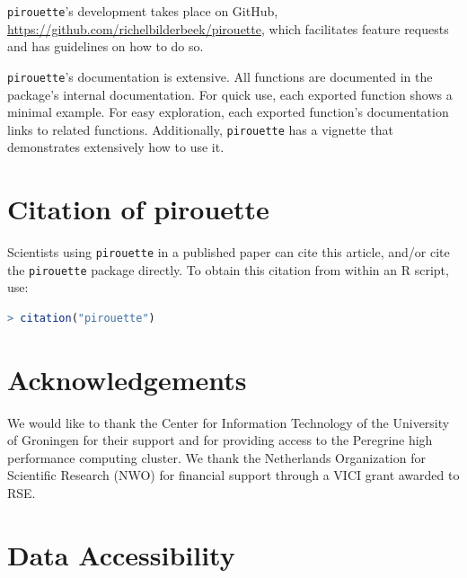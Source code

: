 \documentclass{article}
\begin{document}
\verb;pirouette;'s development takes place on GitHub,
\url{https://github.com/richelbilderbeek/pirouette}, 
which facilitates feature requests and 
has guidelines on how to do so.

\verb;pirouette;'s documentation is extensive. 
All functions are documented in the package's internal documentation. 
For quick use, 
each exported function shows a minimal example. 
For easy exploration, each exported function's documentation links to related functions.
Additionally, \verb;pirouette; has a vignette that demonstrates extensively how to use it. 

\section{Citation of pirouette}

Scientists using \verb;pirouette; in a published paper can cite this
article, and/or cite the \verb;pirouette; package 
directly. To obtain this citation from within an R script, use:

\begin{lstlisting}[language=R]
> citation("pirouette")
\end{lstlisting}

\section{Acknowledgements}

We would like to thank the Center for Information Technology of the University 
of Groningen for their support and for providing access to the Peregrine 
high performance computing cluster. 
We thank the Netherlands 
Organization for Scientific Research (NWO) for financial support 
through a VICI grant awarded to RSE.

\section{Data Accessibility}
\end{document}
